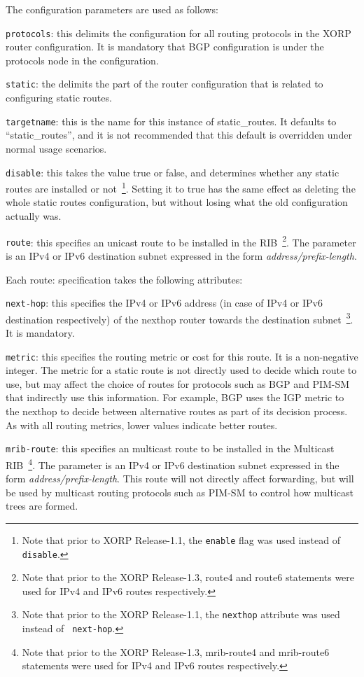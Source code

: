 The configuration parameters are used as follows:
\begin{description}
\item{\tt protocols}: this delimits the configuration for all routing
  protocols in the XORP router configuration.  It is mandatory that
  BGP configuration is under the {\stt protocols} node in the
  configuration.
\item{\tt static}: the delimits the part of the router configuration
  that is related to configuring static routes.
\item{\tt targetname}: this is the name for this instance of
  static\_routes.  It defaults to ``{\stt static\_routes}'', and it is
  not recommended that this default is overridden under normal usage
  scenarios.
\item{\tt disable}: this takes the value {\stt true} or {\stt false},
  and determines whether any static routes are installed or not~\footnote{Note
  that prior to XORP Release-1.1, the {\tt enable} flag was used instead of
  {\tt disable}.}.
  Setting it to {\stt true} has the same effect as deleting the whole
  static routes configuration, but without losing what the old
  configuration actually was.
\item{\tt route}: this specifies an unicast route to be installed in the
  RIB~\footnote{Note that prior to the XORP Release-1.3, route4 and route6
  statements were used for IPv4 and IPv6 routes respectively.}.  The
  parameter is an IPv4 or IPv6 destination subnet expressed in the form
  {\it address/prefix-length}.

  Each {\stt route}: specification takes the following attributes:
\begin{description}
\item{\tt next-hop}: this specifies the IPv4 or IPv6 address (in case of
  IPv4 or IPv6 destination respectively) of the nexthop router towards
  the destination subnet~\footnote{Note that prior to the XORP
  Release-1.1, the {\tt nexthop} attribute was used instead of {\tt
  next-hop}.}. It is mandatory.
\item{\tt metric}: this specifies the routing metric or cost for this
  route.  It is a non-negative integer.  The metric for a static route
  is not directly used to decide which route to use, but may affect
  the choice of routes for protocols such as BGP and PIM-SM that
  indirectly use this information.  For example, BGP uses the IGP
  metric to the nexthop to decide between alternative routes as part
  of its decision process.  As with all routing metrics, lower values
  indicate better routes.
\end{description}
\item{\tt mrib-route}: this specifies an multicast route to be installed
  in the Multicast RIB~\footnote{Note that prior to the XORP
  Release-1.3, mrib-route4 and mrib-route6 statements were used for IPv4
  and IPv6 routes respectively.}.  The parameter is an IPv4 or IPv6
  destination subnet expressed in the form {\it address/prefix-length}.
  This route will not directly affect forwarding, but will be used by
  multicast routing protocols such as PIM-SM to control how multicast
  trees are formed.


\end{description}
